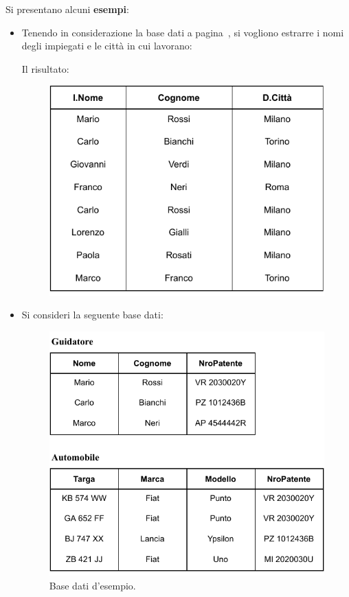\documentclass[a4paper]{article}
\begin{document}
	\noindent
	Si presentano alcuni \textcolor{Green4}{\textbf{esempi}}:
	\begin{itemize}
		\item Tenendo in considerazione la base dati a pagina~\pageref{img: select dbms}, si vogliono estrarre i nomi degli impiegati e le città in cui lavorano:
		
		Il risultato:
		\begin{figure}[!htp]
			\centering
			\includegraphics[width=.55\textwidth]{img/join-ex1.pdf}
		\end{figure}\newpage
	
		\item Si consideri la seguente base dati:
		\begin{figure}[!htp]
			\centering
			\includegraphics[width=.75\textwidth]{img/join-ex_dbms.pdf}
			\caption{Base dati d'esempio.}
		\end{figure}
		

\end{itemize}
\end{document}
